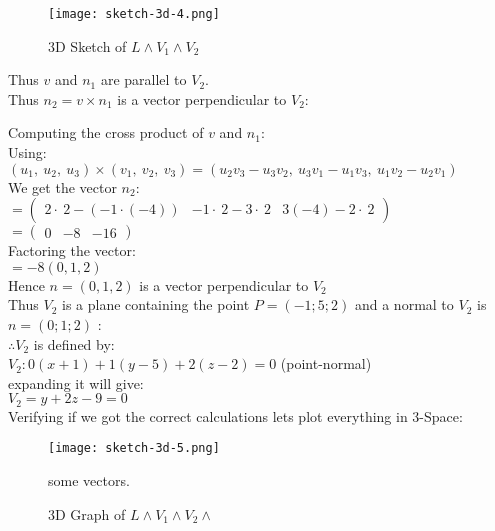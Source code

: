 \begin{figure}[H]
\centering
\texttt{[image: sketch-3d-4.png]}
\caption{3D Sketch of $L \land V_1 \land V_2$}
\label{fig:Plane_3D_worked_4}
\end{figure}

Thus $v$ and $n_1$ are parallel to $V_2$. \\

Thus $n_2 = v \times n_1$ is a vector perpendicular to $V_2$:

Computing the cross product of $v$ and $n_1$: \\ 

Using: \\

$\left(u_1,\:u_2,\:u_3\right)\times \left(v_1,\:v_2,\:v_3\right)=\left(u_2v_3-u_3v_2,\:u_3v_1-u_1v_3,\:u_1v_2-u_2v_1\right)$ \\

We get the vector $n_2$: \\

$= \begin{pmatrix}2\cdot \:2-\left(-1\cdot \left(-4\right)\right)&-1\cdot \:2-3\cdot \:2&3\left(-4\right)-2\cdot \:2\end{pmatrix}$ \\


$= \begin{pmatrix}0&-8&-16\end{pmatrix}$ \\

Factoring the vector: \\

$= -8(0,1,2)$ \\

Hence $n = (0,1,2)$ is a vector perpendicular to $V_2$ \\

Thus $V_2$ is a plane containing the point $P = (-1; 5; 2)$ and a normal to $V_2$ is $n = (0; 1; 2)$ : \\

$\therefore V_2$ is defined by: \\

$V_2: 0(x + 1) + 1 (y - 5) + 2 (z - 2) = 0$ (point-normal) \\

expanding it will give: \\

$V_2 = y+2z-9=0$ \\

Verifying if we got the correct calculations lets plot everything in 3-Space:

\begin{figure}[H]
\centering
\texttt{[image: sketch-3d-5.png]}
\caption{3D Graph of $L \land V_1 \land V_2 \land $} some vectors.
\label{fig:Plane_3D_worked_5}
\end{figure}






























